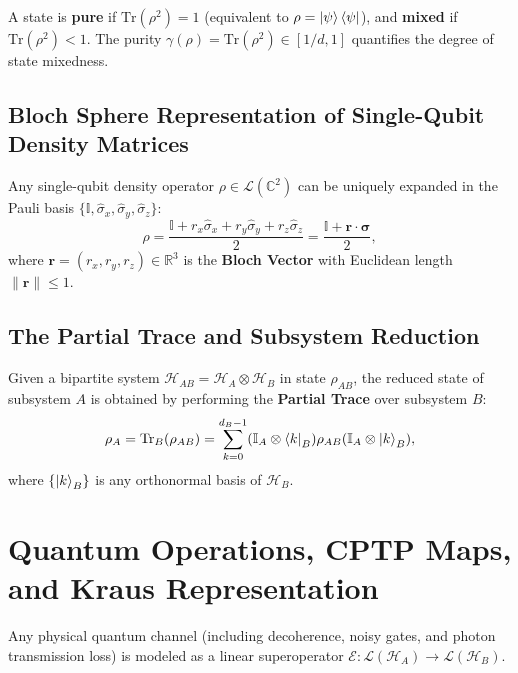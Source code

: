 A state is \textbf{pure} if $\text{Tr}(\rho^2) = 1$ (equivalent to $\rho = \ket{\psi}\bra{\psi}$), and \textbf{mixed} if $\text{Tr}(\rho^2) < 1$. The purity $\gamma(\rho) = \text{Tr}(\rho^2) \in [1/d, 1]$ quantifies the degree of state mixedness.

\subsection{Bloch Sphere Representation of Single-Qubit Density Matrices}
Any single-qubit density operator $\rho \in \mathcal{L}(\mathbb{C}^2)$ can be uniquely expanded in the Pauli basis $\{\mathbb{I}, \hat{\sigma}_x, \hat{\sigma}_y, \hat{\sigma}_z\}$:
\begin{equation}
    \rho = \frac{\mathbb{I} + r_x \hat{\sigma}_x + r_y \hat{\sigma}_y + r_z \hat{\sigma}_z}{2} = \frac{\mathbb{I} + \bm{r} \cdot \bm{\sigma}}{2},
    \label{eq:bloch_vector_def_app_v2}
\end{equation}
where $\bm{r} = (r_x, r_y, r_z) \in \mathbb{R}^3$ is the \textbf{Bloch Vector} with Euclidean length $\|\bm{r}\| \le 1$.

\subsection{The Partial Trace and Subsystem Reduction}
Given a bipartite system $\mathcal{H}_{AB} = \mathcal{H}_A \otimes \mathcal{H}_B$ in state $\rho_{AB}$, the reduced state of subsystem $A$ is obtained by performing the \textbf{Partial Trace} over subsystem $B$:
\begin{equation}
    \rho_A = \text{Tr}_B(\rho_{AB}) = \sum_{k=0}^{d_B - 1} (\mathbb{I}_A \otimes \bra{k}_B) \rho_{AB} (\mathbb{I}_A \otimes \ket{k}_B),
    \label{eq:partial_trace_def_app_v2}
\end{equation}
where $\{\ket{k}_B\}$ is any orthonormal basis of $\mathcal{H}_B$.

\section{Quantum Operations, CPTP Maps, and Kraus Representation}
\label{sec:app_kraus_theorem}

Any physical quantum channel (including decoherence, noisy gates, and photon transmission loss) is modeled as a  linear superoperator $\mathcal{E}: \mathcal{L}(\mathcal{H}_A) \to \mathcal{L}(\mathcal{H}_B)$.


